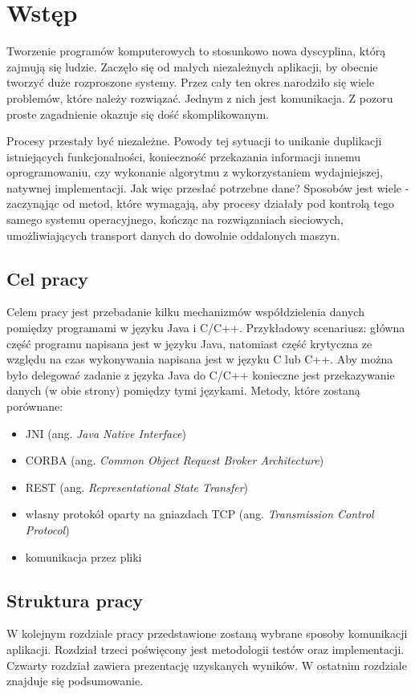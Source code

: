 \chapter{Wstęp}

Tworzenie programów komputerowych to stosunkowo nowa dyscyplina, którą zajmują się ludzie. Zaczęło się od małych niezależnych aplikacji, by obecnie tworzyć duże rozproszone systemy. Przez cały ten okres narodziło się wiele problemów, które należy rozwiązać. Jednym z nich jest komunikacja. Z pozoru proste zagadnienie okazuje się dość skomplikowanym.

Procesy przestały być niezależne. Powody tej sytuacji to unikanie duplikacji istniejących funkcjonalności, konieczność przekazania informacji innemu oprogramowaniu, czy wykonanie algorytmu z wykorzystaniem wydajniejszej, natywnej implementacji. Jak więc przesłać potrzebne dane? Sposobów jest wiele - zaczynąjąc od metod, które wymagają, aby procesy działały pod kontrolą tego samego systemu operacyjnego, kończąc na rozwiązaniach sieciowych, umożliwiających transport danych do dowolnie oddalonych maszyn.


\section{Cel pracy}

Celem pracy jest przebadanie kilku mechanizmów współdzielenia  danych pomiędzy programami w języku Java i C/C++. 
Przykładowy scenariusz: główna część programu napisana jest w języku Java, natomiast część krytyczna ze względu na czas wykonywania napisana jest w języku C lub C++. Aby można było delegować zadanie z języka Java do C/C++ konieczne jest przekazywanie danych (w obie strony) pomiędzy tymi językami. Metody, które zostaną porównane:
\begin{itemize}
    \item JNI (ang. \textit{Java Native Interface})
    \item CORBA (ang. \textit{Common Object Request Broker Architecture})
    \item REST (ang. \textit{Representational State Transfer})
    \item własny protokół oparty na gniazdach TCP (ang. \textit{Transmission Control Protocol})
    \item komunikacja przez pliki
\end{itemize}


\section{Struktura pracy}

W kolejnym rozdziale pracy przedstawione zostaną wybrane sposoby komunikacji aplikacji.
Rozdział trzeci poświęcony jest metodologii testów oraz implementacji.
Czwarty rozdział zawiera prezentację uzyskanych wyników.
W ostatnim rozdziale znajduje się podsumowanie.
